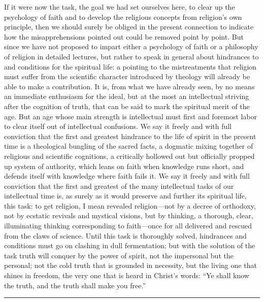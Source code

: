 \documentclass[12pt]{book}
\newcommand{\opage}[1]{\marginnote{\footnotesize\textit{[#1]}}}
\begin{document}
If it were now the task, the goal we had set ourselves here, to clear up
the psychology of faith and to develop the religious concepts from
religion's own principle, then we should surely be obliged in the
present connection to indicate how the misapprehensions pointed out
could be removed point by point. But since we have not proposed to
impart either a psychology of faith or a philosophy of religion in
detailed lectures, but rather to speak in general about hindrances to
and conditions for the spiritual life: a pointing to the mistreatments
that religion must suffer from the scientific character introduced by
theology will already be able to make a contribution. It is, from what
we have already seen, by no means an immediate enthusiasm for the ideal,
but at the most an intellectual striving after the cognition of truth,
that can be said to mark
\opage{89}\setcounter{footnote}{0}%
the spiritual merit of the age. But an age whose main strength is
intellectual must first and foremost labor to clear itself out of
intellectual confusions. We say it freely and with full conviction that
the first and greatest hindrance to the life of spirit in the present
time is a theological bungling of the sacred facts, a dogmatic mixing
together of religious and scientific cognitions, a critically hollowed
out but officially propped up system of authority, which leans on faith
when knowledge runs short, and defends itself with knowledge where faith
fails it. We say it freely and with full conviction that the first and
greatest of the many intellectual tasks of our intellectual time is, as
surely as it would preserve and further its spiritual life, this task:
to get religion, I mean revealed religion---not by a decree of
orthodoxy, not by ecstatic revivals and mystical visions, but by
thinking, a thorough, clear, illuminating thinking corresponding to
faith---once for all delivered and rescued from the claws of science.
Until this task is thoroughly solved, hindrances and conditions must go
on clashing in dull fermentation; but with the solution of the task
truth will conquer by the power of spirit, not the impersonal but the
personal; not the cold truth that is grounded in necessity, but the
living one that shines in freedom, the very one that is heard in
Christ's words: ``Ye shall know the truth, and the truth shall make you
free.''

\begin{center}\rule{3cm}{0.4pt}\end{center}
\end{document}
